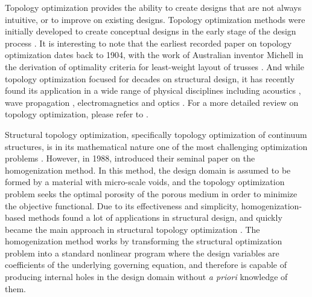 Topology optimization provides the ability to create designs that are not always intuitive, or to improve on existing designs. Topology optimization methods were initially developed to create conceptual designs in the early stage of the design process \citep{BS:03,Rozvany:09}. It is interesting to note that the earliest recorded paper on topology optimization dates back to 1904, with the work of Australian inventor Michell in the derivation of optimality criteria for least-weight layout of trusses \citep{Michell:04}. And while topology optimization focused for decades on structural design, it has recently found its application in a wide range of physical disciplines \citep{BLO+:05} including acoustics \citep{FAN+:04}, wave propagation \citep{Frenzel:04}, electromagnetics \citep{LGD:09,SHW+:08} and optics \citep{BHF+:04,KOY:05}. For a more detailed review on topology optimization, please refer to \citep{BS:03,EO:01}.



Structural topology optimization, specifically topology optimization of continuum structures, is in its mathematical nature one of the most challenging optimization problems \citep{BS:03}. However, in 1988, \citep{BK:88} introduced their seminal paper on the homogenization method. In this method, the design domain is assumed to be formed by a material with micro-scale voids, and the topology optimization problem seeks the optimal porosity of the porous medium in order to minimize the objective functional. Due to its effectiveness and simplicity, homogenization-based methods found a lot of applications in structural design, and quickly became the main approach in structural topology optimization \citep{Bendsoe:89}. The homogenization method works by transforming the structural optimization problem into a standard nonlinear program where the design variables are coefficients of the underlying governing equation, and therefore is capable of producing internal holes in the design domain without \textit{a priori} knowledge of them.

